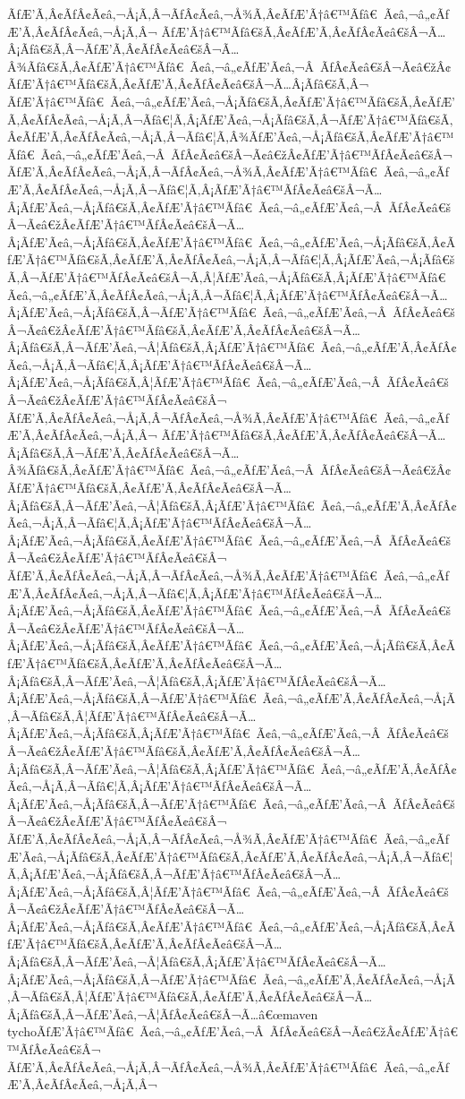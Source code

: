 \documentclass{gemoc} %
\begin{document}
ÃƒÆ’Ã‚Â¢ÃƒÂ¢Ã¢â‚¬Å¡Ã‚Â¬ÃƒÂ¢Ã¢â‚¬Å¾Ã‚Â¢ÃƒÆ’Ã†â€™Ãƒâ€ Ã¢â‚¬â„¢ÃƒÆ’Ã‚Â¢ÃƒÂ¢Ã¢â‚¬Å¡Ã‚Â¬ ÃƒÆ’Ã†â€™Ãƒâ€šÃ‚Â¢ÃƒÆ’Ã‚Â¢ÃƒÂ¢Ã¢â€šÂ¬Ã…Â¡Ãƒâ€šÃ‚Â¬ÃƒÆ’Ã‚Â¢ÃƒÂ¢Ã¢â€šÂ¬Ã…Â¾Ãƒâ€šÃ‚Â¢ÃƒÆ’Ã†â€™Ãƒâ€ Ã¢â‚¬â„¢ÃƒÆ’Ã¢â‚¬Â ÃƒÂ¢Ã¢â€šÂ¬Ã¢â€žÂ¢ÃƒÆ’Ã†â€™Ãƒâ€šÃ‚Â¢ÃƒÆ’Ã‚Â¢ÃƒÂ¢Ã¢â€šÂ¬Ã…Â¡Ãƒâ€šÃ‚Â¬ ÃƒÆ’Ã†â€™Ãƒâ€ Ã¢â‚¬â„¢ÃƒÆ’Ã¢â‚¬Å¡Ãƒâ€šÃ‚Â¢ÃƒÆ’Ã†â€™Ãƒâ€šÃ‚Â¢ÃƒÆ’Ã‚Â¢ÃƒÂ¢Ã¢â‚¬Å¡Ã‚Â¬Ãƒâ€¦Ã‚Â¡ÃƒÆ’Ã¢â‚¬Å¡Ãƒâ€šÃ‚Â¬ÃƒÆ’Ã†â€™Ãƒâ€šÃ‚Â¢ÃƒÆ’Ã‚Â¢ÃƒÂ¢Ã¢â‚¬Å¡Ã‚Â¬Ãƒâ€¦Ã‚Â¾ÃƒÆ’Ã¢â‚¬Å¡Ãƒâ€šÃ‚Â¢ÃƒÆ’Ã†â€™Ãƒâ€ Ã¢â‚¬â„¢ÃƒÆ’Ã¢â‚¬Â ÃƒÂ¢Ã¢â€šÂ¬Ã¢â€žÂ¢ÃƒÆ’Ã†â€™ÃƒÂ¢Ã¢â€šÂ¬ ÃƒÆ’Ã‚Â¢ÃƒÂ¢Ã¢â‚¬Å¡Ã‚Â¬ÃƒÂ¢Ã¢â‚¬Å¾Ã‚Â¢ÃƒÆ’Ã†â€™Ãƒâ€ Ã¢â‚¬â„¢ÃƒÆ’Ã‚Â¢ÃƒÂ¢Ã¢â‚¬Å¡Ã‚Â¬Ãƒâ€¦Ã‚Â¡ÃƒÆ’Ã†â€™ÃƒÂ¢Ã¢â€šÂ¬Ã…Â¡ÃƒÆ’Ã¢â‚¬Å¡Ãƒâ€šÃ‚Â¢ÃƒÆ’Ã†â€™Ãƒâ€ Ã¢â‚¬â„¢ÃƒÆ’Ã¢â‚¬Â ÃƒÂ¢Ã¢â€šÂ¬Ã¢â€žÂ¢ÃƒÆ’Ã†â€™ÃƒÂ¢Ã¢â€šÂ¬Ã…Â¡ÃƒÆ’Ã¢â‚¬Å¡Ãƒâ€šÃ‚Â¢ÃƒÆ’Ã†â€™Ãƒâ€ Ã¢â‚¬â„¢ÃƒÆ’Ã¢â‚¬Å¡Ãƒâ€šÃ‚Â¢ÃƒÆ’Ã†â€™Ãƒâ€šÃ‚Â¢ÃƒÆ’Ã‚Â¢ÃƒÂ¢Ã¢â‚¬Å¡Ã‚Â¬Ãƒâ€¦Ã‚Â¡ÃƒÆ’Ã¢â‚¬Å¡Ãƒâ€šÃ‚Â¬ÃƒÆ’Ã†â€™ÃƒÂ¢Ã¢â€šÂ¬Ã‚Â¦ÃƒÆ’Ã¢â‚¬Å¡Ãƒâ€šÃ‚Â¡ÃƒÆ’Ã†â€™Ãƒâ€ Ã¢â‚¬â„¢ÃƒÆ’Ã‚Â¢ÃƒÂ¢Ã¢â‚¬Å¡Ã‚Â¬Ãƒâ€¦Ã‚Â¡ÃƒÆ’Ã†â€™ÃƒÂ¢Ã¢â€šÂ¬Ã…Â¡ÃƒÆ’Ã¢â‚¬Å¡Ãƒâ€šÃ‚Â¬ÃƒÆ’Ã†â€™Ãƒâ€ Ã¢â‚¬â„¢ÃƒÆ’Ã¢â‚¬Â ÃƒÂ¢Ã¢â€šÂ¬Ã¢â€žÂ¢ÃƒÆ’Ã†â€™Ãƒâ€šÃ‚Â¢ÃƒÆ’Ã‚Â¢ÃƒÂ¢Ã¢â€šÂ¬Ã…Â¡Ãƒâ€šÃ‚Â¬ÃƒÆ’Ã¢â‚¬Â¦Ãƒâ€šÃ‚Â¡ÃƒÆ’Ã†â€™Ãƒâ€ Ã¢â‚¬â„¢ÃƒÆ’Ã‚Â¢ÃƒÂ¢Ã¢â‚¬Å¡Ã‚Â¬Ãƒâ€¦Ã‚Â¡ÃƒÆ’Ã†â€™ÃƒÂ¢Ã¢â€šÂ¬Ã…Â¡ÃƒÆ’Ã¢â‚¬Å¡Ãƒâ€šÃ‚Â¦ÃƒÆ’Ã†â€™Ãƒâ€ Ã¢â‚¬â„¢ÃƒÆ’Ã¢â‚¬Â ÃƒÂ¢Ã¢â€šÂ¬Ã¢â€žÂ¢ÃƒÆ’Ã†â€™ÃƒÂ¢Ã¢â€šÂ¬ ÃƒÆ’Ã‚Â¢ÃƒÂ¢Ã¢â‚¬Å¡Ã‚Â¬ÃƒÂ¢Ã¢â‚¬Å¾Ã‚Â¢ÃƒÆ’Ã†â€™Ãƒâ€ Ã¢â‚¬â„¢ÃƒÆ’Ã‚Â¢ÃƒÂ¢Ã¢â‚¬Å¡Ã‚Â¬ ÃƒÆ’Ã†â€™Ãƒâ€šÃ‚Â¢ÃƒÆ’Ã‚Â¢ÃƒÂ¢Ã¢â€šÂ¬Ã…Â¡Ãƒâ€šÃ‚Â¬ÃƒÆ’Ã‚Â¢ÃƒÂ¢Ã¢â€šÂ¬Ã…Â¾Ãƒâ€šÃ‚Â¢ÃƒÆ’Ã†â€™Ãƒâ€ Ã¢â‚¬â„¢ÃƒÆ’Ã¢â‚¬Â ÃƒÂ¢Ã¢â€šÂ¬Ã¢â€žÂ¢ÃƒÆ’Ã†â€™Ãƒâ€šÃ‚Â¢ÃƒÆ’Ã‚Â¢ÃƒÂ¢Ã¢â€šÂ¬Ã…Â¡Ãƒâ€šÃ‚Â¬ÃƒÆ’Ã¢â‚¬Â¦Ãƒâ€šÃ‚Â¡ÃƒÆ’Ã†â€™Ãƒâ€ Ã¢â‚¬â„¢ÃƒÆ’Ã‚Â¢ÃƒÂ¢Ã¢â‚¬Å¡Ã‚Â¬Ãƒâ€¦Ã‚Â¡ÃƒÆ’Ã†â€™ÃƒÂ¢Ã¢â€šÂ¬Ã…Â¡ÃƒÆ’Ã¢â‚¬Å¡Ãƒâ€šÃ‚Â¢ÃƒÆ’Ã†â€™Ãƒâ€ Ã¢â‚¬â„¢ÃƒÆ’Ã¢â‚¬Â ÃƒÂ¢Ã¢â€šÂ¬Ã¢â€žÂ¢ÃƒÆ’Ã†â€™ÃƒÂ¢Ã¢â€šÂ¬ ÃƒÆ’Ã‚Â¢ÃƒÂ¢Ã¢â‚¬Å¡Ã‚Â¬ÃƒÂ¢Ã¢â‚¬Å¾Ã‚Â¢ÃƒÆ’Ã†â€™Ãƒâ€ Ã¢â‚¬â„¢ÃƒÆ’Ã‚Â¢ÃƒÂ¢Ã¢â‚¬Å¡Ã‚Â¬Ãƒâ€¦Ã‚Â¡ÃƒÆ’Ã†â€™ÃƒÂ¢Ã¢â€šÂ¬Ã…Â¡ÃƒÆ’Ã¢â‚¬Å¡Ãƒâ€šÃ‚Â¢ÃƒÆ’Ã†â€™Ãƒâ€ Ã¢â‚¬â„¢ÃƒÆ’Ã¢â‚¬Â ÃƒÂ¢Ã¢â€šÂ¬Ã¢â€žÂ¢ÃƒÆ’Ã†â€™ÃƒÂ¢Ã¢â€šÂ¬Ã…Â¡ÃƒÆ’Ã¢â‚¬Å¡Ãƒâ€šÃ‚Â¢ÃƒÆ’Ã†â€™Ãƒâ€ Ã¢â‚¬â„¢ÃƒÆ’Ã¢â‚¬Å¡Ãƒâ€šÃ‚Â¢ÃƒÆ’Ã†â€™Ãƒâ€šÃ‚Â¢ÃƒÆ’Ã‚Â¢ÃƒÂ¢Ã¢â€šÂ¬Ã…Â¡Ãƒâ€šÃ‚Â¬ÃƒÆ’Ã¢â‚¬Â¦Ãƒâ€šÃ‚Â¡ÃƒÆ’Ã†â€™ÃƒÂ¢Ã¢â€šÂ¬Ã…Â¡ÃƒÆ’Ã¢â‚¬Å¡Ãƒâ€šÃ‚Â¬ÃƒÆ’Ã†â€™Ãƒâ€ Ã¢â‚¬â„¢ÃƒÆ’Ã‚Â¢ÃƒÂ¢Ã¢â‚¬Å¡Ã‚Â¬Ãƒâ€šÃ‚Â¦ÃƒÆ’Ã†â€™ÃƒÂ¢Ã¢â€šÂ¬Ã…Â¡ÃƒÆ’Ã¢â‚¬Å¡Ãƒâ€šÃ‚Â¡ÃƒÆ’Ã†â€™Ãƒâ€ Ã¢â‚¬â„¢ÃƒÆ’Ã¢â‚¬Â ÃƒÂ¢Ã¢â€šÂ¬Ã¢â€žÂ¢ÃƒÆ’Ã†â€™Ãƒâ€šÃ‚Â¢ÃƒÆ’Ã‚Â¢ÃƒÂ¢Ã¢â€šÂ¬Ã…Â¡Ãƒâ€šÃ‚Â¬ÃƒÆ’Ã¢â‚¬Â¦Ãƒâ€šÃ‚Â¡ÃƒÆ’Ã†â€™Ãƒâ€ Ã¢â‚¬â„¢ÃƒÆ’Ã‚Â¢ÃƒÂ¢Ã¢â‚¬Å¡Ã‚Â¬Ãƒâ€¦Ã‚Â¡ÃƒÆ’Ã†â€™ÃƒÂ¢Ã¢â€šÂ¬Ã…Â¡ÃƒÆ’Ã¢â‚¬Å¡Ãƒâ€šÃ‚Â¬ÃƒÆ’Ã†â€™Ãƒâ€ Ã¢â‚¬â„¢ÃƒÆ’Ã¢â‚¬Â ÃƒÂ¢Ã¢â€šÂ¬Ã¢â€žÂ¢ÃƒÆ’Ã†â€™ÃƒÂ¢Ã¢â€šÂ¬ ÃƒÆ’Ã‚Â¢ÃƒÂ¢Ã¢â‚¬Å¡Ã‚Â¬ÃƒÂ¢Ã¢â‚¬Å¾Ã‚Â¢ÃƒÆ’Ã†â€™Ãƒâ€ Ã¢â‚¬â„¢ÃƒÆ’Ã¢â‚¬Å¡Ãƒâ€šÃ‚Â¢ÃƒÆ’Ã†â€™Ãƒâ€šÃ‚Â¢ÃƒÆ’Ã‚Â¢ÃƒÂ¢Ã¢â‚¬Å¡Ã‚Â¬Ãƒâ€¦Ã‚Â¡ÃƒÆ’Ã¢â‚¬Å¡Ãƒâ€šÃ‚Â¬ÃƒÆ’Ã†â€™ÃƒÂ¢Ã¢â€šÂ¬Ã…Â¡ÃƒÆ’Ã¢â‚¬Å¡Ãƒâ€šÃ‚Â¦ÃƒÆ’Ã†â€™Ãƒâ€ Ã¢â‚¬â„¢ÃƒÆ’Ã¢â‚¬Â ÃƒÂ¢Ã¢â€šÂ¬Ã¢â€žÂ¢ÃƒÆ’Ã†â€™ÃƒÂ¢Ã¢â€šÂ¬Ã…Â¡ÃƒÆ’Ã¢â‚¬Å¡Ãƒâ€šÃ‚Â¢ÃƒÆ’Ã†â€™Ãƒâ€ Ã¢â‚¬â„¢ÃƒÆ’Ã¢â‚¬Å¡Ãƒâ€šÃ‚Â¢ÃƒÆ’Ã†â€™Ãƒâ€šÃ‚Â¢ÃƒÆ’Ã‚Â¢ÃƒÂ¢Ã¢â€šÂ¬Ã…Â¡Ãƒâ€šÃ‚Â¬ÃƒÆ’Ã¢â‚¬Â¦Ãƒâ€šÃ‚Â¡ÃƒÆ’Ã†â€™ÃƒÂ¢Ã¢â€šÂ¬Ã…Â¡ÃƒÆ’Ã¢â‚¬Å¡Ãƒâ€šÃ‚Â¬ÃƒÆ’Ã†â€™Ãƒâ€ Ã¢â‚¬â„¢ÃƒÆ’Ã‚Â¢ÃƒÂ¢Ã¢â‚¬Å¡Ã‚Â¬Ãƒâ€šÃ‚Â¦ÃƒÆ’Ã†â€™Ãƒâ€šÃ‚Â¢ÃƒÆ’Ã‚Â¢ÃƒÂ¢Ã¢â€šÂ¬Ã…Â¡Ãƒâ€šÃ‚Â¬ÃƒÆ’Ã¢â‚¬Â¦ÃƒÂ¢Ã¢â€šÂ¬Ã…â€œmaven tychoÃƒÆ’Ã†â€™Ãƒâ€ Ã¢â‚¬â„¢ÃƒÆ’Ã¢â‚¬Â ÃƒÂ¢Ã¢â€šÂ¬Ã¢â€žÂ¢ÃƒÆ’Ã†â€™ÃƒÂ¢Ã¢â€šÂ¬ ÃƒÆ’Ã‚Â¢ÃƒÂ¢Ã¢â‚¬Å¡Ã‚Â¬ÃƒÂ¢Ã¢â‚¬Å¾Ã‚Â¢ÃƒÆ’Ã†â€™Ãƒâ€ Ã¢â‚¬â„¢ÃƒÆ’Ã‚Â¢ÃƒÂ¢Ã¢â‚¬Å¡Ã‚Â¬ 
\end{document}
